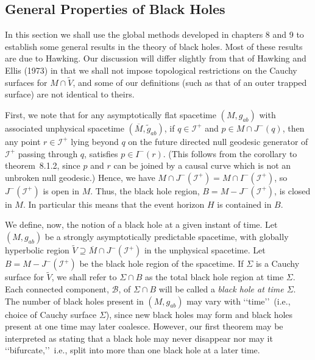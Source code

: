 
\subsection{General Properties of Black Holes}\label{sec:12.2}
\setcounter{theorem}{0}

In this section we shall use the global methods developed in chapters 8 and 9 to
establish some general results in the theory of black holes. Most of these results are
due to Hawking. Our discussion will differ slightly from that of Hawking and Ellis
(1973) in that we shall not impose topological restrictions on the Cauchy surfaces for
\(M\cap\widetilde V\), and some of our definitions (such as that of an outer trapped
surface) are not identical to theirs.

First, we note that for any asymptotically flat spacetime \((M,g_{ab})\) with
associated unphysical spacetime \((\overline M,\widetilde g_{ab})\), if
\(q\in\mathcal I^+\) and \(p\in M\cap J^-(q)\), then any point \(r\in\mathcal I^+\)
lying beyond \(q\) on the future directed null geodesic generator of \(\mathcal I^+\)
passing through \(q\), satisfies \(p\in I^-(r)\). (This follows from the corollary to
theorem~8.1.2, since \(p\) and \(r\) can be joined by a causal curve which is not an
unbroken null geodesic.) Hence, we have
\(M\cap J^-(\mathcal I^+)=M\cap I^-(\mathcal I^+)\), so
\(J^-(\mathcal I^+)\) is open in \(M\). Thus, the black hole region,
\(B=M-J^-(\mathcal I^+)\), is closed in \(M\). In particular this means that the
event horizon \(H\) is contained in \(B\).

We define, now, the notion of a black hole at a given instant of time. Let
\((M,g_{ab})\) be a strongly asymptotically predictable spacetime, with globally
hyperbolic region \(\widetilde V\supseteq\overline M\cap J^-(\mathcal I^+)\) in the
unphysical spacetime. Let \(B=M-J^-(\mathcal I^+)\) be the black hole region of the
spacetime. If \(\Sigma\) is a Cauchy surface for \(\widetilde V\), we shall refer to
\(\Sigma\cap B\) as the total black hole region at time \(\Sigma\). Each connected
component, \(\mathcal B\), of \(\Sigma\cap B\) will be called a \emph{black hole at
time \(\Sigma\)}. The number of black holes present in \((M,g_{ab})\) may vary with
\lq\lq time\rq\rq\ (i.e., choice of Cauchy surface \(\Sigma\)), since new black holes
may form and black holes present at one time may later coalesce. However, our first
theorem may be interpreted as stating that a black hole may never disappear nor may
it \lq\lq bifurcate,\rq\rq\ i.e., split into more than one black hole at a later time.


